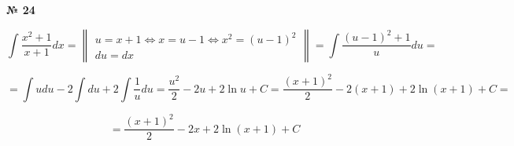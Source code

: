 \documentclass{article}
\begin{document}
\textbf{№ 24} 

$$ \int \frac{x^2+1}{x+1} dx 
= \begin{Vmatrix}  u = x+1 \Leftrightarrow x = u-1 \Leftrightarrow x^2 = (u-1)^2 \\
                  du = dx \end{Vmatrix}
= \int \frac{(u-1)^2+1}{u}du
= $$

$$ = \int udu - 2 \int du + 2 \int \frac{1}{u}du
= \frac{u^2}{2} -2u + 2\ln{u} + C
= \frac{(x+1)^2}{2} -2(x+1) + 2\ln{(x+1)} + C
=  $$

$$ = \frac{(x+1)^2}{2} -2x + 2\ln{(x+1)} + C $$
\end{document}
